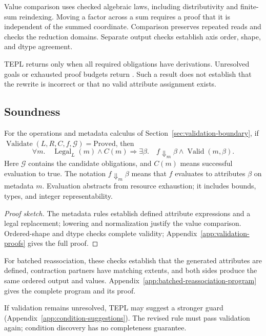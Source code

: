 Value comparison uses checked algebraic laws, including
distributivity and finite-sum reindexing. Moving a factor across a
sum requires a proof that it is independent of the summed coordinate.
Comparison preserves repeated reads and checks the reduction domains.
Separate output checks establish axis order, shape, and dtype
agreement.

TEPL returns  only when all required obligations have
derivations. Unresolved goals or exhausted proof budgets return
. Such a result does not establish that the rewrite is
incorrect or that no valid attribute assignment exists.

\subsection{Soundness}
\label{sec:acceptance-soundness}
\begin{theorem}
\label{thm:validator-soundness}
For the operations and metadata calculus of
Section~\ref{sec:validation-boundary}, if
$\operatorname{Validate}(L,R,C,f,\mathcal G)=\mathrm{Proved}$, then
\begin{equation}
 \forall m.\quad \operatorname{Legal}_L(m)\land C(m)
 \Longrightarrow\exists\beta.\quad f\Downarrow_m\beta
 \land\operatorname{Valid}(m,\beta).
 \label{eq:acceptance-soundness}
\end{equation}
Here $\mathcal G$ contains the candidate obligations, and $C(m)$
means successful evaluation to true. The notation $f\Downarrow_m\beta$
means that $f$ evaluates to attributes $\beta$ on metadata $m$.
Evaluation abstracts from resource exhaustion; it includes bounds,
types, and integer representability.
\end{theorem}

\begin{proof}[Proof sketch]
The metadata rules establish defined attribute expressions and a
legal replacement; lowering and normalization justify the value
comparison. Ordered-shape and dtype checks complete validity;
Appendix~\ref{app:validation-proofs} gives the full proof.
\end{proof}

For batched reassociation, these checks establish that the generated
attributes are defined, contraction partners have matching extents,
and both sides produce the same ordered output and values.
Appendix~\ref{app:batched-reassociation-program} gives the complete
program and its proof.

If validation remains unresolved, TEPL may suggest a stronger guard
(Appendix~\ref{app:condition-suggestions}). The revised rule must pass
validation again; condition discovery has no completeness guarantee.
